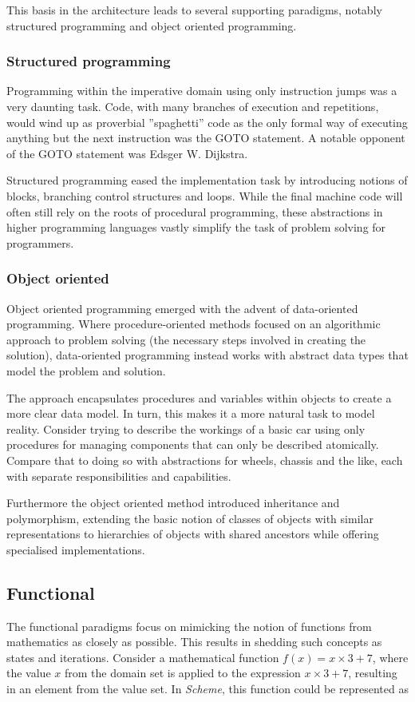 This basis in the architecture leads to several supporting paradigms, notably structured programming and object oriented programming.

\subsubsection*{Structured programming}
Programming within the imperative domain using only instruction jumps was a very daunting task. Code, with many branches of execution and repetitions, would wind up as proverbial ''spaghetti'' code as the only formal way of executing anything but the next instruction was the GOTO statement. A notable opponent of the GOTO statement was Edsger W. Dijkstra.\cite{goto}

Structured programming eased the implementation task by introducing notions of blocks, branching control structures and loops. While the final machine code will often still rely on the roots of procedural programming, these abstractions in higher programming languages vastly simplify the task of problem solving for programmers.

\subsubsection*{Object oriented}
Object oriented programming emerged with the advent of data-oriented programming. Where procedure-oriented methods focused on an algorithmic approach to problem solving (the necessary steps involved in creating the solution), data-oriented programming instead works with abstract data types that model the problem and solution.

The approach encapsulates procedures and variables within objects to create a more clear data model. In turn, this makes it a more natural task to model reality. Consider trying to describe the workings of a basic car using only procedures for managing components that can only be described atomically. Compare that to doing so with abstractions for wheels, chassis and the like, each with separate responsibilities and capabilities.

Furthermore the object oriented method introduced inheritance and polymorphism, extending the basic notion of classes of objects with similar representations to hierarchies of objects with shared ancestors while offering specialised implementations.

\subsection{Functional}
The functional paradigms focus on mimicking the notion of functions from mathematics as closely as possible. This results in shedding such concepts as states and iterations. Consider a mathematical function $f(x) = x \times 3+7$, where the value $x$ from the domain set is applied to the expression $x \times 3+7$, resulting in an element from the value set. In \emph{Scheme}, this function could be represented as

